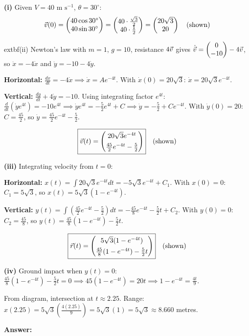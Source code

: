 \begin{solution}
\textbf{(i)} Given $V = 40 \text{ m s}^{-1}$, $\theta = 30^\circ$:
\[
\vec{v}(0) = \begin{pmatrix} 40 \cos 30^\circ \\ 40 \sin 30^\circ \end{pmatrix} = \begin{pmatrix} 40 \cdot \frac{\sqrt{3}}{2} \\ 40 \cdot \frac{1}{2} \end{pmatrix} = \begin{pmatrix} 20\sqrt{3} \\ 20 \end{pmatrix} \quad \text{(shown)}
\]

	extbf{(ii)} Newton's law with $m=1$, $g=10$, resistance $4\vec{v}$ gives $\dot{\vec{v}} = \begin{pmatrix} 0 \\ -10 \end{pmatrix} - 4\vec{v}$, so $\ddot{x} = -4\dot{x}$ and $\ddot{y} = -10 - 4\dot{y}$.

\textbf{Horizontal:} $\frac{d\dot{x}}{dt} = -4\dot{x} \implies \dot{x} = Ae^{-4t}$. With $\dot{x}(0) = 20\sqrt{3}$: $\dot{x} = 20\sqrt{3}e^{-4t}$.

\textbf{Vertical:} $\frac{d\dot{y}}{dt} + 4\dot{y} = -10$. Using integrating factor $e^{4t}$: $\frac{d}{dt}(\dot{y}e^{4t}) = -10e^{4t} \implies \dot{y}e^{4t} = -\frac{5}{2}e^{4t} + C \implies \dot{y} = -\frac{5}{2} + Ce^{-4t}$.
With $\dot{y}(0) = 20$: $C = \frac{45}{2}$, so $\dot{y} = \frac{45}{2}e^{-4t} - \frac{5}{2}$.

\[
\boxed{\vec{v}(t) = \begin{pmatrix} 20\sqrt{3}e^{-4t} \\[4pt] \frac{45}{2}e^{-4t} - \frac{5}{2} \end{pmatrix}} \quad \text{(shown)}
\]

\textbf{(iii)} Integrating velocity from $t=0$:

\textbf{Horizontal:} $x(t) = \int 20\sqrt{3}e^{-4t} dt = -5\sqrt{3}e^{-4t} + C_1$. With $x(0)=0$: $C_1 = 5\sqrt{3}$, so $x(t) = 5\sqrt{3}(1-e^{-4t})$.

\textbf{Vertical:} $y(t) = \int \left(\frac{45}{2}e^{-4t} - \frac{5}{2}\right) dt = -\frac{45}{8}e^{-4t} - \frac{5}{2}t + C_2$. With $y(0)=0$: $C_2 = \frac{45}{8}$, so $y(t) = \frac{45}{8}(1-e^{-4t}) - \frac{5}{2}t$.

\[
\boxed{\vec{r}(t) = \begin{pmatrix} 5\sqrt{3}(1 - e^{-4t}) \\[4pt] \frac{45}{8}(1 - e^{-4t}) - \frac{5}{2}t \end{pmatrix}} \quad \text{(shown)}
\]

\textbf{(iv)} Ground impact when $y(t)=0$: $\frac{45}{8}(1-e^{-4t}) - \frac{5}{2}t = 0 \implies 45(1-e^{-4t}) = 20t \implies 1-e^{-4t} = \frac{4t}{9}$.

From diagram, intersection at $t \approx 2.25$. Range: $x(2.25) = 5\sqrt{3}\left(\frac{4(2.25)}{9}\right) = 5\sqrt{3}(1) = 5\sqrt{3} \approx 8.660$ metres.

\textbf{Answer:} 
\end{solution}

